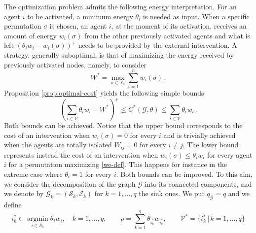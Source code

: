 \documentclass[12pt,twoside,reqno]{amsart}
\theoremstyle{definition}
\numberwithin{equation}{section}
\newcommand{\be}{\begin{equation}}
\newcommand{\ee}{\end{equation}}
\newcommand{\mc}{\mathcal}
\newcommand{\0}{\mathbf{0}}
\newcommand{\1}{\mathbf{1}}
\newcommand{\thre}{\theta}
\newcommand{\threabs}{\theta}
\newcommand{\Thre}{\mathbf{\theta}}
\newcommand{\we}{W^*}
\DeclareMathOperator*{\argmin}{argmin}
\begin{document}
{The optimization problem admits the following energy interpretation.
 For an agent $i$ to be activated, a minimum energy $\threabs_i$ is needed as input. When a specific permutation $\sigma$ is chosen, an agent $i$, at the moment of its activation, receives an amount of energy $w_i(\sigma)$ from the other previously activated agents and what is left $(\threabs_iw_i-w_i(\sigma))^+$ needs to be provided by the external intervention.  
A strategy, generally suboptimal, is that of maximizing the energy received by previously activated nodes, namely, to consider
\be\label{we-def} \we=\max\limits_{\sigma \in \mathcal S_n}\sum\limits_{i=1}^n w_i(\sigma)\,.\ee
Proposition \ref{prop:optimal-cost} yields the following simple bounds
\be\label{sumhsigma2}\left(\sum\limits_{i\in\mc V}\threabs_iw_i-\we\right)^+\leq C^*(\mc G, \threabs)\leq \sum\limits_{i\in\mc V}\threabs_iw_i\,.\ee
Both bounds can be achieved. 
Notice that the upper bound corresponds to
%
the cost of an intervention when $w_i(\sigma)=0$ for every $i$ and is trivially achieved when the agents are totally isolated $W_{ij}=0$ for every $i\neq j$. The lower bound represents instead the cost of an intervention when $w_i(\sigma)\leq \threabs_iw_i$ for every agent $i$ for a permutation maximizing \eqref{we-def}. This happens for instance in the extreme case where $\theta_i=1$ for every $i$.
Both bounds can be improved. To this aim, we consider the decomposition of the graph $\mc G$ into its connected components, and we denote by $\mc G_k=(\mc S_k, \mc E_k)$ for $k=1,\dots ,q$ the sink ones. We put $q_{\mc G}=q$ and we define 
\be  i^*_k\in\argmin\limits_{i\in \mc S_k} \thre_iw_i,\quad k=1,\dots , q,\qquad \rho=\sum\limits_{k=1}^q\thre_{i^*_k}w_{i^*_k},\qquad \mc V^*=\{i^*_k\,|\, k=1,\dots ,q\}\ee
}
\end{document}
